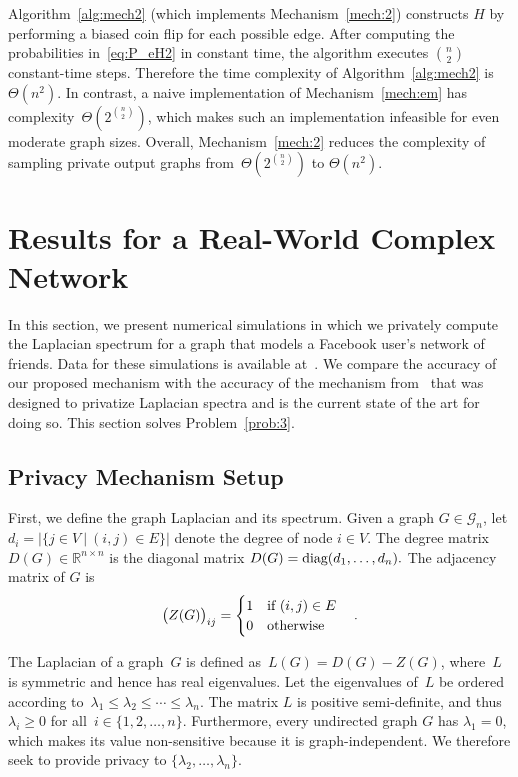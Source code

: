 \documentclass[conference]{ieeeconf}
\newcommand{\G}{\mathcal{G}}
\begin{document}
Algorithm~\ref{alg:mech2} (which implements Mechanism~\ref{mech:2}) constructs $H$ by performing a biased coin flip for each possible edge.
After computing the probabilities in~\eqref{eq:P_eH2} in constant time, the algorithm executes $\binom{n}{2}$ constant-time steps.
Therefore the time complexity of Algorithm~\ref{alg:mech2} is $\Theta(n^2).$
In contrast, a naive implementation of Mechanism~\ref{mech:em} 
has complexity~$\Theta(2^{\binom{n}{2}})$, which makes such an implementation infeasible for even moderate graph sizes.
Overall, Mechanism~\ref{mech:2} reduces the complexity of sampling 
private output graphs
from~$\Theta(2^{\binom{n}{2}})$ to 
$\Theta(n^2)$. 


\section{Results for a Real-World Complex Network} \label{sec:IV}
In this section, we present numerical simulations in which we privately compute the Laplacian spectrum 
for a graph that models a Facebook user's network of friends. Data for these simulations is available at~\cite{snapnets}.  We compare the accuracy of our proposed mechanism with the accuracy of the mechanism from~\cite{hawkins2023node} that was designed to privatize Laplacian spectra and is the current
state of the art for doing so. 
This section solves Problem~\ref{prob:3}.

\subsection{Privacy Mechanism Setup}
First, we define the graph Laplacian and its spectrum.
Given a graph $G \in \G_n$, let $d_i=|\{j\in V \ | \ (i,j)\in E\}|$ denote the degree of node $i\in V$. The degree matrix $D(G)\in \mathbb{R}^{n\times n}$ is the diagonal matrix $D(G)=\textnormal{diag}(d_1,\dots,d_n).$ The adjacency matrix of $G$ is 
\begin{equation}
    \big(Z(G)\big)_{ij}= \begin{cases}
        1 \quad \textnormal{if} \ (i,j)\in E \\
        0 \quad \textnormal{otherwise}
    \end{cases}.
\end{equation}

The Laplacian of a graph~$G$ is defined as~$L(G)=D(G)-Z(G)$, where~$L$ is symmetric and hence has real eigenvalues. 
Let the eigenvalues of~$L$ be ordered according to~$\lambda_1 \leq \lambda_2 \leq \cdots \leq \lambda_n$. The matrix $L$ is positive semi-definite, and thus~$\lambda_i \geq 0$ for all~$i\in\{1,2,\dots, n\}$.
Furthermore, every undirected graph $G$ has $\lambda_1 = 0$, which makes its value non-sensitive because
it is graph-independent. We therefore seek to provide privacy to $\{\lambda_2, \dots, \lambda_n\}$. 
\end{document}
